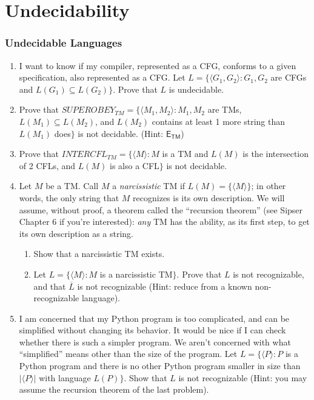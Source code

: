 \part{Undecidability}

\section{Undecidable Languages}

\begin{enumerate}[resume]

\item {} I want to know if my compiler, represented as a CFG, conforms to a given specification, also represented as a CFG. Let $L = \{\langle G_1, G_2 \rangle : G_1, G_2$ are CFGs and $L(G_1) \subseteq L(G_2)\}$. Prove that $L$ is undecidable.

\item {} Prove that $SUPEROBEY_{TM} = \{ \langle M_1, M_2 \rangle : M_1, M_2$ are TMs, $L(M_1) \subseteq L(M_2)$, and $L(M_2)$ contains at least 1 more string than $L(M_1)$ does$\}$ is not decidable. (Hint: $\mathsf{E}_{\mathsf{TM}}$)

\item {} Prove that $INTERCFL_{TM} = \{ \langle M \rangle : M$ is a TM and $L(M)$ is the intersection of 2 CFLs, and $L(M)$ is also a CFL$\}$ is not decidable.

\item {} Let $M$ be a TM. Call $M$ a \emph{narcissistic} TM if $L(M) = \{ \langle M \rangle \}$; in other words, the only string that $M$ recognizes is its own description. We will assume, without proof, a theorem called the ``recursion theorem'' (see Sipser Chapter 6 if you're interested): \emph{any} TM has the ability, as its first step, to get its own description as a string.
\begin{enumerate}
	\item Show that a narcissistic TM exists.
	\item Let $L = \{ \langle M \rangle : M$ is a narcissistic TM$\}$. Prove that $L$ is not recognizable, and that $\overline{L}$ is not recognizable (Hint: reduce from a known non-recognizable language). 
\end{enumerate}

\item {} I am concerned that my Python program is too complicated, and can be simplified without changing its behavior. It would be nice if I can check whether there is such a simpler program. We aren't concerned with what ``simplified'' means other than the size of the program. Let $L = \{ \langle P \rangle : P$ is a Python program and there is no other Python program smaller in size than $|\langle P \rangle|$ with language $L(P)\}$. Show that $L$ is not recognizable (Hint: you may assume the recursion theorem of the last problem).
\end{enumerate}